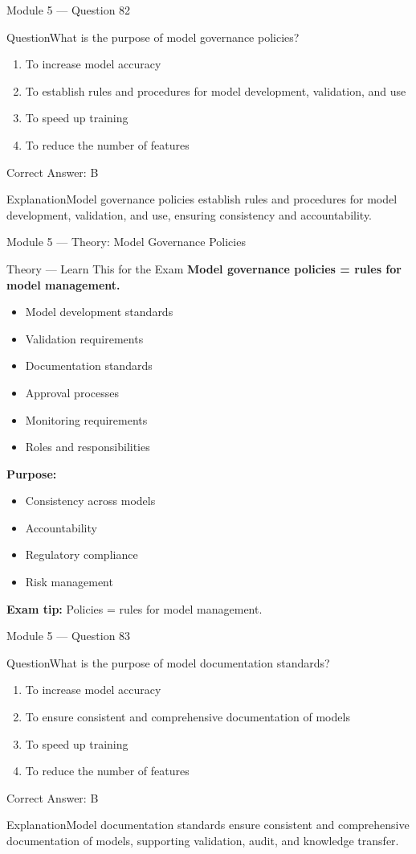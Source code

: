 \documentclass[aspectratio=169,10pt]{beamer}
\newcommand{\question}[1]{\begin{block}{Question}#1\end{block}}
\newcommand{\options}[4]{%
	\begin{enumerate}[label=\Alph*.,leftmargin=*]
		\item #1
		\item #2
		\item #3
		\item #4
	\end{enumerate}
}
\newcommand{\answerbox}[1]{\begin{exampleblock}{Correct Answer: #1}\end{exampleblock}}
\newcommand{\explain}[1]{\begin{block}{Explanation}#1\end{block}}
\newcommand{\theory}[1]{%
	\begin{block}{Theory --- Learn This for the Exam}
		\small #1
	\end{block}
}
\begin{document}
	\begin{frame}{Module 5 --- Question 82}
		\question{What is the purpose of model governance policies?}
		\options{To increase model accuracy}{To establish rules and procedures for model development, validation, and use}{To speed up training}{To reduce the number of features}
		\answerbox{B}
		\explain{Model governance policies establish rules and procedures for model development, validation, and use, ensuring consistency and accountability.}
	\end{frame}
	
	\begin{frame}{Module 5 --- Theory: Model Governance Policies}
		\theory{
			\textbf{Model governance policies = rules for model management.}
			\begin{itemize}
				\item Model development standards
				\item Validation requirements
				\item Documentation standards
				\item Approval processes
				\item Monitoring requirements
				\item Roles and responsibilities
			\end{itemize}
			\textbf{Purpose:}
			\begin{itemize}
				\item Consistency across models
				\item Accountability
				\item Regulatory compliance
				\item Risk management
			\end{itemize}
			\textbf{Exam tip:} Policies = rules for model management.
		}
	\end{frame}
	
	\begin{frame}{Module 5 --- Question 83}
		\question{What is the purpose of model documentation standards?}
		\options{To increase model accuracy}{To ensure consistent and comprehensive documentation of models}{To speed up training}{To reduce the number of features}
		\answerbox{B}
		\explain{Model documentation standards ensure consistent and comprehensive documentation of models, supporting validation, audit, and knowledge transfer.}
	\end{frame}
	
\end{document}
